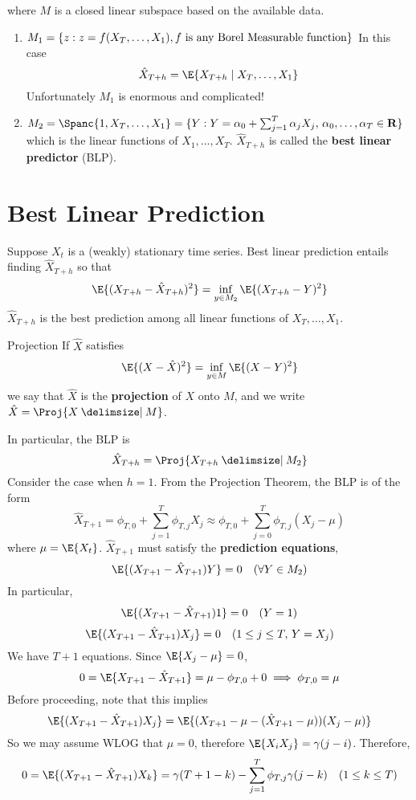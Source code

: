 where $ M $ is a closed linear subspace based on the available
data.
\begin{enumerate}[(1)]
    \item $ M_1=\{z:z=f(X_{T},\ldots,X_{1}), f\text{ is any
                  Borel Measurable function}\} $
          In this case
          \[ \hat{X}_{T+h}=\E{X_{T+h}\mid X_{T},\ldots,X_1} \]
          Unfortunately $ M_1 $ is enormous and complicated!
    \item $ M_2=\Spanc{1,X_{T},\ldots,X_1}=
              \set{Y:Y=\alpha_0+\sum_{j=1}^{T} \alpha_j X_j,\,\alpha_0,\ldots,\alpha_T\in\mathbf{R}} $
          which is the linear functions of $ X_1,\ldots,X_T $.
          $ \hat{X}_{T+h} $ is called the \textbf{best linear predictor} (BLP).
\end{enumerate}
\section{Best Linear Prediction}
Suppose $ X_t $ is a (weakly) stationary time series.
Best linear prediction entails finding $ \hat{X}_{T+h} $ so that
\[ \E{(X_{T+h}-\hat{X}_{T+h})^2}=\inf_{y\in M_2}\E{(X_{T+h}-Y)^2} \]
$ \hat{X}_{T+h} $ is the best prediction among all linear
functions of $ X_T,\ldots,X_1 $.
\begin{Definition}{Projection}{}
    If $ \hat{X} $ satisfies
    \[ \E{(X-\hat{X})^2}=\inf_{y\in M}\E{(X-Y)^2} \]
    we say that $ \hat{X} $ is the \textbf{projection}
    of $ X $ onto $ M $, and we write $ \hat{X}=\Proj{X\onto M} $.
\end{Definition}
In particular, the BLP is
\[ \hat{X}_{T+h}=\Proj{X_{T+h}\onto M_2} \]
Consider the case when $ h=1 $. From the Projection Theorem, the BLP
is of the form
\[ \hat{X}_{T+1}=\phi_{T,0}+\sum_{j=1}^{T} \phi_{T,j}X_j \approx
    \phi_{T,0}+\sum_{j=0}^{T} \phi_{T,j}(X_j-\mu) \]
where $ \mu=\E{X_t} $. $ \hat{X}_{T+1} $ must satisfy
the \textbf{prediction equations},
\[ \E{(X_{T+1}-\hat{X}_{T+1})Y}=0\quad (\forall  Y\in M_2 ) \]
In particular,
\[ \E{(X_{T+1}-\hat{X}_{T+1})1}=0\quad(Y=1) \]
\[ \E{(X_{T+1}-\hat{X}_{T+1})X_j}=0\quad(1\le j\le T,\, Y=X_j) \]
We have $ T+1 $ equations. Since $ \E{X_{j}-\mu}=0 $,
\[ 0=\E{X_{T+1}-\hat{X}_{T+1}}=\mu-\phi_{T,0}+0\implies \phi_{T,0}=\mu \]
Before proceeding, note that this implies
\[ \E{(X_{T+1}-\hat{X}_{T+1})X_j}=\E{(X_{T+1}-\mu-(\hat{X}_{T+1}-\mu))(X_{j}-\mu)} \]
So we may assume WLOG that $ \mu=0 $, therefore $ \E{X_i X_j}=\gamma(j-i) $.
Therefore,
\[ 0=\E{(X_{T+1}-\hat{X}_{T+1})X_k}=\gamma(T+1-k)-\sum_{j=1}^{T} \phi_{T,j}\gamma(j-k)\quad(1\le k\le T) \]
